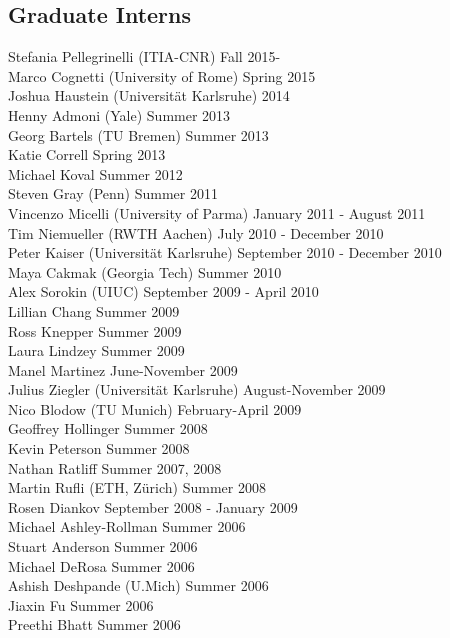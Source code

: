 \subsection{Graduate Interns}
\noindent
Stefania Pellegrinelli (ITIA-CNR) \hfill Fall 2015-\\
Marco Cognetti (University of Rome) \hfill Spring 2015\\
Joshua Haustein (Universit\"at Karlsruhe) \hfill 2014\\
Henny Admoni (Yale) \hfill Summer 2013\\
Georg Bartels (TU Bremen) \hfill Summer 2013\\
Katie Correll  \hfill Spring 2013\\
Michael Koval  \hfill Summer 2012\\
Steven Gray (Penn) \hfill Summer 2011\\
Vincenzo Micelli (University of Parma) \hfill January 2011 - August 2011\\
Tim Niemueller (RWTH Aachen) \hfill July 2010 - December 2010\\ 
Peter Kaiser (Universit\"at Karlsruhe) \hfill September 2010 - December 2010\\ 
Maya Cakmak (Georgia Tech) \hfill Summer 2010\\ 
Alex Sorokin (UIUC) \hfill September 2009 - April 2010\\ 
Lillian Chang  \hfill Summer 2009\\
Ross Knepper  \hfill Summer 2009\\
Laura Lindzey  \hfill Summer 2009\\
Manel Martinez  \hfill June-November 2009\\
Julius Ziegler (Universit\"at Karlsruhe) \hfill August-November 2009\\
Nico Blodow (TU Munich) \hfill February-April 2009\\
Geoffrey Hollinger  \hfill Summer 2008\\
Kevin Peterson  \hfill Summer 2008\\
Nathan Ratliff  \hfill Summer 2007, 2008\\
Martin Rufli (ETH, Z\"urich) \hfill Summer 2008\\
Rosen Diankov  \hfill September 2008 - January 2009\\
Michael Ashley-Rollman  \hfill Summer 2006\\
Stuart Anderson  \hfill Summer 2006\\
Michael DeRosa  \hfill Summer 2006\\
Ashish Deshpande (U.Mich) \hfill Summer 2006\\
Jiaxin Fu  \hfill Summer 2006\\
Preethi Bhatt  \hfill Summer 2006\\


